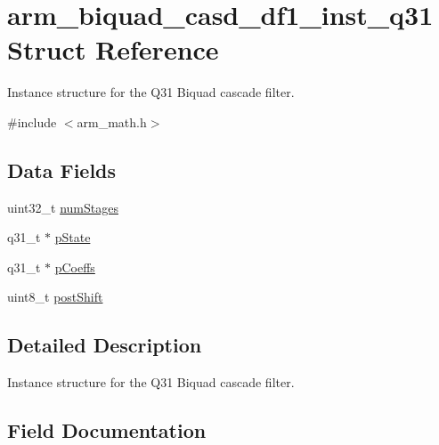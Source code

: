 \hypertarget{structarm__biquad__casd__df1__inst__q31}{}\section{arm\+\_\+biquad\+\_\+casd\+\_\+df1\+\_\+inst\+\_\+q31 Struct Reference}
\label{structarm__biquad__casd__df1__inst__q31}


Instance structure for the Q31 Biquad cascade filter.  




{\ttfamily \#include $<$arm\+\_\+math.\+h$>$}

\subsection*{Data Fields}
\begin{DoxyCompactItemize}
\item 
uint32\+\_\+t \hyperlink{structarm__biquad__casd__df1__inst__q31_aed9c8a6224cd149e8e12b17b25b9b767}{num\+Stages}
\item 
q31\+\_\+t $\ast$ \hyperlink{structarm__biquad__casd__df1__inst__q31_adee4ba3ee8869865af7d8fa08ca913d6}{p\+State}
\item 
q31\+\_\+t $\ast$ \hyperlink{structarm__biquad__casd__df1__inst__q31_a68888e36167d81cb7836db10367a1682}{p\+Coeffs}
\item 
uint8\+\_\+t \hyperlink{structarm__biquad__casd__df1__inst__q31_a74050e9f36542bd56f4052381a82ae8f}{post\+Shift}
\end{DoxyCompactItemize}


\subsection{Detailed Description}
Instance structure for the Q31 Biquad cascade filter. 

\subsection{Field Documentation}
\mbox{\label{structarm__biquad__casd__df1__inst__q31_aed9c8a6224cd149e8e12b17b25b9b767}} 
